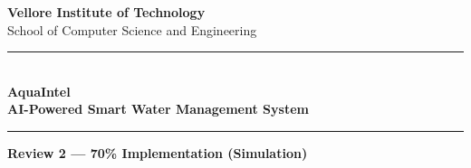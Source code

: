 \documentclass[12pt,a4paper]{article}
\begin{document}

\begin{titlepage}
    \centering
    \vspace*{1cm}

    \begin{figure}[H]
        \centering
    \end{figure}

    \vspace{0.3cm}

    {\Large\textbf{Vellore Institute of Technology}}\\[0.2cm]
    {\large School of Computer Science and Engineering}

    \vspace{1.5cm}

    \rule{\textwidth}{1.5pt}\\[0.4cm]
    {\Huge\bfseries\textcolor{titleblue}{AquaIntel}}\\[0.3cm]
    {\LARGE\textbf{AI-Powered Smart Water Management System}}\\[0.1cm]
    \rule{\textwidth}{1.5pt}

    \vspace{0.8cm}

    {\Large\textbf{Review 2 — 70\% Implementation (Simulation)}}

    \vspace{1.5cm}


\end{titlepage}
\end{document}
